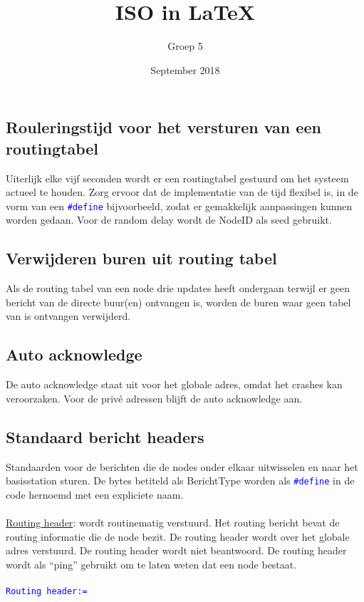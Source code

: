 \documentclass[a4paper, 11pt]{article}
\title{ISO in \LaTeX}
\author{Groep 5}
\date{September 2018}
\newcommand{\blue}[1]{\textcolor{blue}{#1}}
\begin{document}
\maketitle
\clearpage
{}
\clearpage

\subsection*{Rouleringstijd voor het versturen van een routingtabel}
Uiterlijk elke vijf seconden wordt er een routingtabel gestuurd om het systeem actueel te
houden. Zorg ervoor dat de implementatie van de tijd flexibel is, in de vorm van een \blue{\texttt{\#define}} bijvoorbeeld, zodat er gemakkelijk aanpassingen kunnen worden gedaan. Voor de random delay wordt de NodeID als seed gebruikt.

\subsection*{Verwijderen buren uit routing tabel}
Als de routing tabel van een node drie updates heeft ondergaan terwijl er geen bericht van de directe buur(en) ontvangen is, worden de buren waar geen tabel van is ontvangen verwijderd.

\subsection*{Auto acknowledge}
De auto acknowledge staat uit voor het globale adres, omdat het crashes kan veroorzaken. Voor de privé adressen blijft de auto acknowledge aan.

\subsection*{Standaard bericht headers}
Standaarden voor de berichten die de nodes onder elkaar uitwisselen en naar het basisstation sturen. De bytes betiteld als BerichtType worden als \blue{\texttt{\#define}} in de code hernoemd met een expliciete naam.\\\\
\underline{Routing header}: wordt routinematig verstuurd. Het routing bericht bevat de routing informatie die de node bezit. De routing header wordt over het globale adres verstuurd. De routing
header wordt niet beantwoord. De routing header wordt als “ping” gebruikt om te laten weten dat een node bestaat. \\\\
\blue{\texttt{Routing header:=}}
\end{document}
